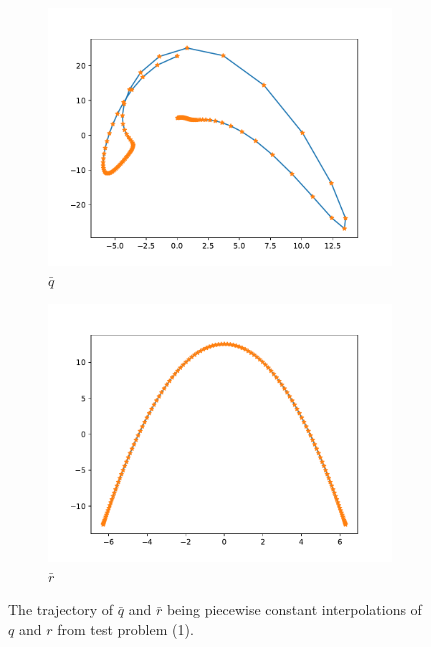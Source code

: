 
\begin{figure}[t]\label{fig:curve_1_pc}
    \begin{subfigure}[t]{0.5\textwidth}\label{fig:curve_1_pc_q}
        \centering
        \includegraphics[width=\linewidth]{figures/curve_1_pc/curve_q_pc.pdf}
        \caption{\(\bar q\)}
    \end{subfigure}
    \begin{subfigure}[t]{0.5\textwidth}\label{fig:curve_1_pc_r}
        \centering
        \includegraphics[width=\linewidth]{figures/curve_1_pc/curve_r_pc.pdf}
        \caption{\(\bar r\)}
    \end{subfigure}
    \caption{The trajectory of \(\bar q\) and \(\bar r\) being piecewise constant interpolations of $q$ and $r$ from test problem (1).}
\end{figure}

